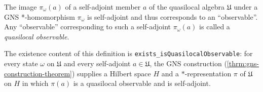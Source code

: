 \begin{definition}
    \label{def:quasilocal-observable}
    \leanok
    The image $\pi_\omega(a)$ of a self-adjoint member $a$ of the quasilocal algebra $\mathfrak{U}$ under a GNS *-homomorphism $\pi_\omega$ is self-adjoint and thus corresponds to an ``observable''. Any ``observable'' corresponding to such a self-adjoint $\pi_\omega(a)$ is called a \textit{quasilocal observable}.

    The existence content of this definition is \texttt{exists\_isQuasilocalObservable}: for every state $\omega$ on $\mathfrak{U}$ and every self-adjoint $a \in \mathfrak{U}$, the GNS construction (\ref{thrm:gns-construction-theorem}) supplies a Hilbert space $H$ and a $*$-representation $\pi$ of $\mathfrak{U}$ on $H$ in which $\pi(a)$ is a quasilocal observable and is self-adjoint.
\end{definition}

